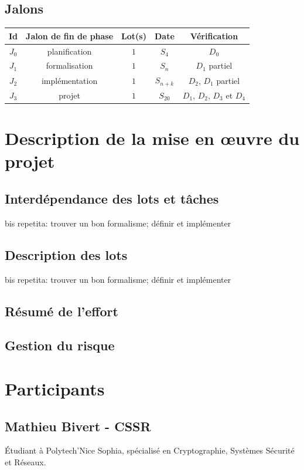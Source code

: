 \documentclass[a4paper]{article}
\begin{document}
\subsection{Jalons}
\begin{table}
\centering
\begin{tabular}{c|c|c|c|c}
	Id & Jalon de fin de phase & Lot(s) & Date & Vérification \\
	\hline
	\hline
	$J_0$ & planification & $1$ & $S_4$ & $D_0$ \\
	\hline
	$J_1$ & formalisation & $1$ & $S_n$ & $D_1$ partiel \\
	\hline
	$J_2$ & implémentation & $1$ & $S_{n+k}$ & $D_2$, $D_1$ partiel \\
	\hline
	$J_3$ & projet & $1$ & $S_{20}$ & $D_1$, $D_2$, $D_3$ et $D_4$ \\
\end{tabular}
\end{table}

\section{Description de la mise en œuvre du projet}
\subsection{Interdépendance des lots et tâches}
bis repetita: trouver un bon formalisme; définir et implémenter
\subsection{Description des lots}
bis repetita: trouver un bon formalisme; définir et implémenter
\subsection{Résumé de l'effort}
\subsection{Gestion du risque}

\section{Participants}
\subsection{Mathieu Bivert - CSSR}
Étudiant à Polytech'Nice Sophia, spécialisé en Cryptographie, Systèmes
Sécurité et Réseaux.
\end{document}

